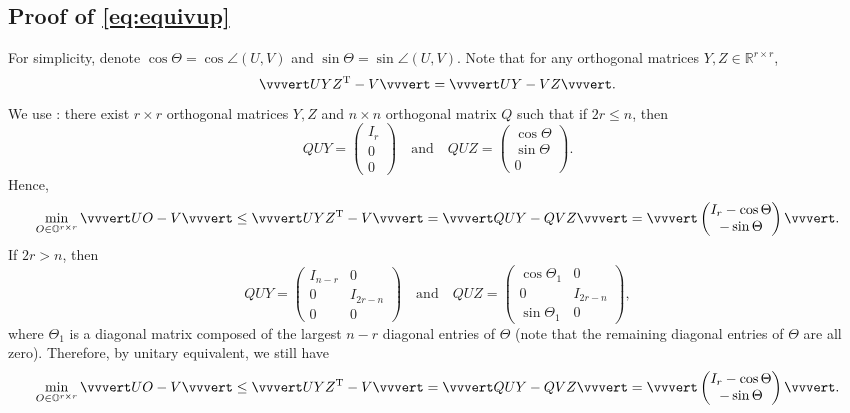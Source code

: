 \documentclass[reqno]{amsart}
\newcommand{\T}{\mathrm{T}}
\theoremstyle{plain}
\theoremstyle{definition}
\begin{document}
\subsection{Proof of \eqref{eq:equivup}}\label{app:proofequi}
For simplicity, denote $\cos\Theta = \cos\angle(U,V)$ and $\sin\Theta = \sin\angle(U,V)$. Note that for any orthogonal matrices $Y, Z \in \mathbb R^{r\times r}$,
$$\vvvert UYZ^\T- V\vvvert =\vvvert UY- VZ\vvvert.$$
We use \cite[Theorem VII.1.8]{Bhatia}: there exist $r\times r$ orthogonal matrices $Y, Z$ and $n\times n$ orthogonal matrix $Q$ such that if $2r\le n$, then
\begin{equation*}
QUY= \begin{pmatrix}
I_r\\
0\\
0
\end{pmatrix} \quad \text{and}\quad
QUZ= \begin{pmatrix}
\cos\Theta\\
\sin\Theta\\
0
\end{pmatrix}.
\end{equation*}
Hence, 
\begin{equation*}
\min_{O\in \mathbb{O}^{r\times r}} \vvvert UO- V\vvvert \le \vvvert UYZ^\T- V\vvvert =\vvvert QUY- QVZ\vvvert= \vvvert 
\begin{pmatrix}
I_r - \cos\Theta \\
-\sin\Theta
\end{pmatrix}
\vvvert.
\end{equation*}
If $2r>n$, then 
\begin{equation*}
QUY= \begin{pmatrix}
I_{n-r} & 0\\
0 & I_{2r-n}\\
0&0
\end{pmatrix} \quad \text{and}\quad
QUZ= \begin{pmatrix}
\cos\Theta_1& 0 \\
0 & I_{2r-n}\\
\sin\Theta_1 & 0
\end{pmatrix},
\end{equation*}
where $\Theta_1$ is a diagonal matrix composed of the largest $n-r$ diagonal entries of $\Theta$ (note that the remaining diagonal entries of $\Theta$ are all zero). Therefore, by unitary equivalent, we still have 
\begin{equation}\label{eq:mindis}
\min_{O\in \mathbb{O}^{r\times r}} \vvvert UO- V\vvvert \le \vvvert UYZ^\T- V\vvvert =\vvvert QUY- QVZ\vvvert= \vvvert 
\begin{pmatrix}
I_r - \cos\Theta \\
-\sin\Theta
\end{pmatrix}
\vvvert.
\end{equation}
\end{document}
